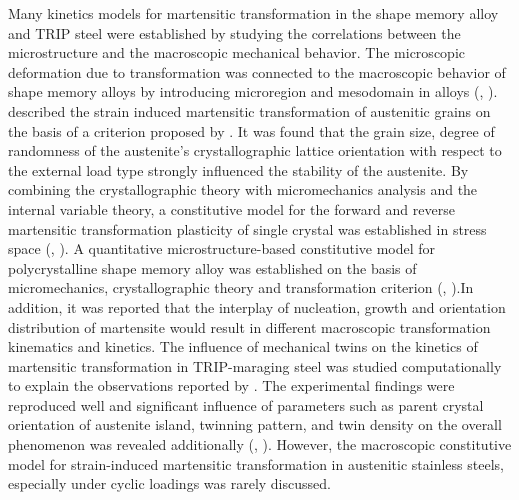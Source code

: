 \documentclass[final,5p,times,onecolumn,10pt,sort&compress]{elsarticle}
\begin{document}
Many kinetics models for martensitic transformation in the shape memory alloy and TRIP steel were established by studying the correlations between the microstructure and the macroscopic mechanical behavior. The microscopic deformation due to transformation was connected to the macroscopic behavior of shape memory alloys by introducing microregion and mesodomain in alloys (\citeauthor{FISCHER1992A}, \citeyear{FISCHER1992A}). \cite{REISNER19982457} described the strain induced martensitic transformation of austenitic grains on the basis of a criterion proposed by \cite{Fischer1997}. It was found that the grain size, degree of randomness of the austenite's crystallographic lattice orientation with respect to the external load type strongly influenced the stability of the austenite. By combining the crystallographic theory with micromechanics analysis and the internal variable theory, a constitutive model for the forward and reverse martensitic transformation plasticity of single crystal was established in stress space (\citeauthor{YanWY1998A}, \citeyear{YanWY1998A}). A quantitative microstructure-based constitutive model for polycrystalline shape memory alloy was established on the basis of micromechanics, crystallographic theory and transformation criterion (\citeauthor{Song2000Effect}, \citeyear{Song2000Effect}).In addition, it was reported that the interplay of nucleation, growth and orientation distribution of martensite would result in different macroscopic transformation kinematics and kinetics. The influence of mechanical twins on the kinetics of martensitic transformation in TRIP-maraging steel was studied computationally to explain the observations reported by \cite{WANG2014268}. The experimental findings were reproduced well and significant influence of parameters such as parent crystal orientation of austenite island, twinning pattern, and twin density on the overall phenomenon was revealed additionally (\citeauthor{GUPTA2018213}, \citeyear{GUPTA2018213}). However, the macroscopic constitutive model for strain-induced martensitic transformation in austenitic stainless steels, especially under cyclic loadings was rarely discussed.
\end{document}
